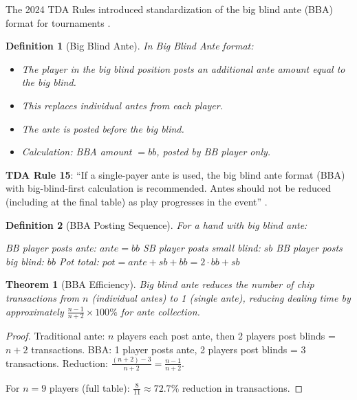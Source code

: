 \documentclass[11pt,a4paper]{article}
\newtheorem{definition}{Definition}[section]
\newtheorem{theorem}{Theorem}[section]
\begin{document}
The 2024 TDA Rules introduced standardization of the big blind ante (BBA) format for tournaments \cite{tda2024rules}.

\begin{definition}[Big Blind Ante]
\label{def:bba}
In Big Blind Ante format:
\begin{itemize}
    \item The player in the big blind position posts an additional ante amount equal to the big blind.
    \item This replaces individual antes from each player.
    \item The ante is posted before the big blind.
    \item Calculation: BBA amount $= bb$, posted by BB player only.
\end{itemize}
\end{definition}

\textbf{TDA Rule 15}: ``If a single-payer ante is used, the big blind ante format (BBA) with big-blind-first calculation is recommended. Antes should not be reduced (including at the final table) as play progresses in the event'' \cite{tda2024rules}.

\begin{definition}[BBA Posting Sequence]
\label{def:bba-sequence}
For a hand with big blind ante:
\begin{algorithmic}[1]
\State BB player posts ante: $ante = bb$
\State SB player posts small blind: $sb$
\State BB player posts big blind: $bb$
\State Pot total: $pot = ante + sb + bb = 2 \cdot bb + sb$
\end{algorithmic}
\end{definition}

\begin{theorem}[BBA Efficiency]
\label{thm:bba-efficiency}
Big blind ante reduces the number of chip transactions from $n$ (individual antes) to 1 (single ante), reducing dealing time by approximately $\frac{n-1}{n+2} \times 100\%$ for ante collection.
\end{theorem}

\begin{proof}
Traditional ante: $n$ players each post ante, then 2 players post blinds = $n + 2$ transactions.
BBA: 1 player posts ante, 2 players post blinds = $3$ transactions.
Reduction: $\frac{(n+2) - 3}{n+2} = \frac{n-1}{n+2}$.

For $n=9$ players (full table): $\frac{8}{11} \approx 72.7\%$ reduction in transactions.
\end{proof}
\end{document}
